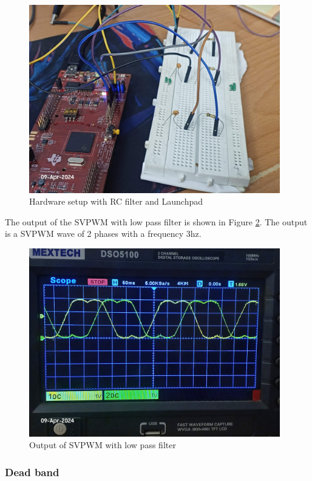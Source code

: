 \begin{figure}[H]
	\centering
	\includegraphics[width=4.3in]{sections/section6/images/SVPWM/LPFandC2000.jpg}
	\caption{Hardware setup with RC filter and Launchpad}
	\label{fig:hardwareSetupLPF}
\end{figure}

The output of the SVPWM with low pass filter is shown in Figure \ref{fig:OutputLPF}. The output is a SVPWM wave of 2 phases with a frequency 3hz.


\begin{figure}[H]
	\centering
	\includegraphics[width=4.3in]{sections/section6/images/SVPWM/SVPWM2phases.jpg}
	\caption{Output of SVPWM with low pass filter}
	\label{fig:OutputLPF}
\end{figure}


\subsubsection{Dead band}

